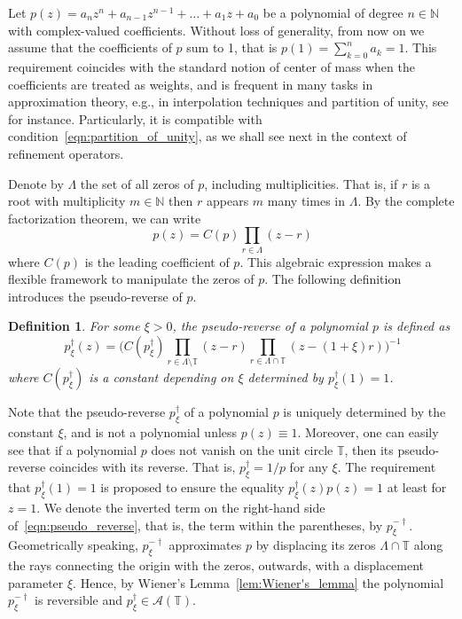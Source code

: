 \documentclass[12pt]{article}
\newtheorem{defin}{Definition}[section]
\begin{document}
Let $p(z)=a_nz^n+ a_{n-1}z^{n-1}+\dots + a_1z + a_0$ be a polynomial of degree $n\in\mathbb{N}$ with complex-valued coefficients. Without loss of generality, from now on we assume that the coefficients of $p$ sum to 1, that is $p(1)=\sum_{k=0}^na_k=1$. This requirement coincides with the standard notion of center of mass when the coefficients are treated as weights, and is frequent in many tasks in approximation theory, e.g., in interpolation techniques and partition of unity, see~\cite{cavoretto2021adaptive} for instance. Particularly, it is compatible with condition~\eqref{eqn:partition_of_unity}, as we shall see next in the context of refinement operators.

Denote by $\Lambda$ the set of all zeros of $p$, including multiplicities. That is, if $r$ is a root with multiplicity $m\in\mathbb{N}$ then $r$ appears $m$ many times in $\Lambda$. By the complete factorization theorem, we can write
\begin{equation*}~\label{eqn:factorization_of_p}
p(z) = C(p)\prod_{r\in\Lambda}(z-r)
\end{equation*}
where $C(p)$ is the leading coefficient of $p$. This algebraic expression makes a flexible framework to manipulate the zeros of $p$. The following definition introduces the pseudo-reverse of $p$.

\begin{defin}
    For some $\xi>0$, the pseudo-reverse of a polynomial $p$ is defined as
    \begin{equation}~\label{eqn:pseudo_reverse}
        p_\xi^\dagger(z)=\bigg(C(p_\xi^\dagger)\prod_{r\in\Lambda\setminus\mathbb{T}}(z-r) \prod_{r\in\Lambda\cap\mathbb{T}}(z-(1 + \xi) r)\bigg)^{-1}
    \end{equation}
    where $C(p_\xi^\dagger)$ is a constant depending on $\xi$ determined by $p_\xi^\dagger(1)=1$.
\end{defin}

Note that the pseudo-reverse $p_\xi^\dagger$ of a polynomial $p$ is uniquely determined by the constant $\xi$, and is not a polynomial unless $p(z)\equiv1$. Moreover, one can easily see that if a polynomial $p$ does not vanish on the unit circle $\mathbb{T}$, then its pseudo-reverse coincides with its reverse. That is, $p_\xi^{\dagger}=1/p$ for any $\xi$. The requirement that $p_\xi^\dagger(1)=1$ is proposed to ensure the equality $p_\xi^\dagger(z)p(z)=1$ at least for $z=1$. We denote the inverted term on the right-hand side of~\eqref{eqn:pseudo_reverse}, that is, the term within the parentheses, by $p_\xi^{-\dagger}$. Geometrically speaking, $p_\xi^{-\dagger}$ approximates $p$ by displacing its zeros $\Lambda\cap\mathbb{T}$ along the rays connecting the origin with the zeros, outwards, with a displacement parameter $\xi$. Hence, by Wiener's Lemma~\ref{lem:Wiener's_lemma} the polynomial $p_\xi^{-\dagger}$ is reversible and $p_\xi^\dagger\in\mathcal{A}(\mathbb{T})$.
\end{document}
